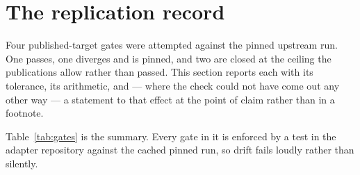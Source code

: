 \section{The replication record}
\label{sec:validation}

Four published-target gates were attempted against the pinned upstream run. One passes, one diverges and is pinned, and two are closed at the ceiling the publications allow rather than passed. This section reports each with its tolerance, its arithmetic, and --- where the check could not have come out any other way --- a statement to that effect at the point of claim rather than in a footnote.

Table~\ref{tab:gates} is the summary. Every gate in it is enforced by a test in the adapter repository against the cached pinned run, so drift fails loudly rather than silently.

